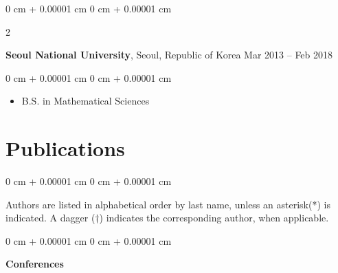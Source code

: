 \documentclass[10pt, letterpaper]{article}
\newenvironment{highlights}{
    \begin{itemize}[
        topsep=0.10 cm,
        parsep=0.10 cm,
        partopsep=0pt,
        itemsep=0pt,
        leftmargin=0 cm + 10pt
    ]
}{
    \end{itemize}
} %
\newenvironment{onecolentry}{
    \begin{adjustwidth}{
        0 cm + 0.00001 cm
    }{
        0 cm + 0.00001 cm
    }
}{
    \end{adjustwidth}
} %
\newenvironment{twocolentry}[2][]{
    \onecolentry
    \def\secondColumn{#2}
    \setcolumnwidth{\fill, 4.5 cm}
    \begin{paracol}{2}
}{
    \switchcolumn \raggedleft \secondColumn
    \end{paracol}
    \endonecolentry
} %
\begin{document}
        \vspace{0.2 cm}

        \begin{twocolentry}{
            Mar 2013 – Feb 2018
        }
            \textbf{Seoul National University}, Seoul, Republic of Korea\end{twocolentry}

        \vspace{0.10 cm}
        \begin{onecolentry}
            \begin{highlights}
                \item B.S. in Mathematical Sciences
            \end{highlights}
        \end{onecolentry}

    \section{Publications}
        \begin{onecolentry}
            Authors are listed in alphabetical order by last name, unless an asterisk(*) is indicated. A dagger (†) indicates the corresponding author, when applicable.
        \end{onecolentry}

        \vspace{0.2 cm}
        
        \begin{onecolentry}
            \textbf{Conferences}
        \end{onecolentry}
        
\end{document}
